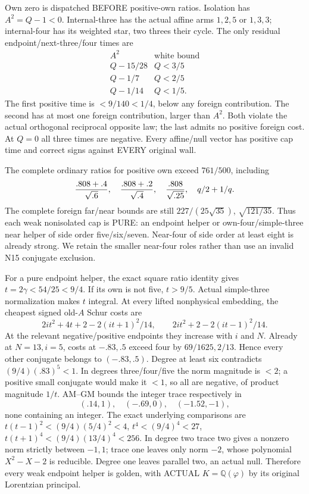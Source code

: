 Own zero is dispatched BEFORE positive-own
ratios.
Isolation has \(A^2=Q-1<0\).
Internal-three has the actual affine arms
\(1,2,5\) or \(1,3,3\); internal-four has its
weighted star, two threes their cycle.
The only residual endpoint/next-three/four
times are
\[
 \begin{array}{c|c}
 A^2&\text{white bound}\\ \hline
 Q-15/28&Q<3/5\\
 Q-1/7&Q<2/5\\
 Q-1/14&Q<1/5 .
 \end{array}
\]
The first positive time is \(<9/140<1/4\),
below any foreign contribution.
The second has at most one foreign contribution,
larger than \(A^2\).
Both violate the actual orthogonal reciprocal
opposite law; the last admits no positive
foreign cost.
At \(Q=0\) all three times are negative.
Every affine/null vector has positive cap time
and correct signs against EVERY original wall.

The complete ordinary ratios for positive own
exceed \(761/500\), including
\[
 { .808+.4\over\sqrt{.6}},\quad
 { .808+.2\over\sqrt{.4}},\quad
 { .808\over\sqrt{.25}},\quad q/2+1/q .
\]
The complete foreign far/near bounds are still
\(227/(25\sqrt{35})\), \(\sqrt{121/35}\).
Thus each weak nonisolated cap is PURE:
an endpoint helper or own-four/simple-three
near helper of side order five/six/seven.
Near-four of side order at least eight is
already strong.
We retain the smaller near-four roles rather
than use an invalid N15 conjugate exclusion.

For a pure endpoint helper, the exact square
ratio identity gives \(t=2\gamma<54/25<9/4\).
If its own is not five, \(t>9/5\).
Actual simple-three normalization makes \(t\)
integral.
At every lifted nonphysical embedding, the
cheapest signed old-\(A\) Schur costs are
\[
 2it^2+4t+2-2(it+1)^2/14,\qquad
 2it^2+2-2(it-1)^2/14 .
\]
At the relevant negative/positive endpoints
they increase with \(i\) and \(N\).
Already at \(N=13,i=5\), costs at \(-.83,.5\)
exceed four by \(69/1625,2/13\).
Hence every other conjugate belongs to
\((-.83,.5)\).
Degree at least six contradicts
\((9/4)(.83)^5<1\).
In degrees three/four/five the norm magnitude
is \(<2\); a positive small conjugate would
make it \(<1\), so all are negative, of product
magnitude \(1/t\).
AM--GM bounds the integer trace respectively in
\[
                         (.14,1),\quad(-.69,0),\quad(-1.52,-1),
\]
none containing an integer.
The exact underlying comparisons are
\(t(t-1)^2<(9/4)(5/4)^2<4\),
\(t^4<(9/4)^4<27\),
\(t(t+1)^4<(9/4)(13/4)^4<256\).
In degree two trace two gives a nonzero norm
strictly between \(-1,1\);
trace one leaves only norm \(-2\), whose
polynomial \(X^2-X-2\) is reducible.
Degree one leaves parallel two, an actual null.
Therefore every weak endpoint helper is golden,
with ACTUAL \(K=\mathbb Q(\varphi)\) by its
original Lorentzian principal.

